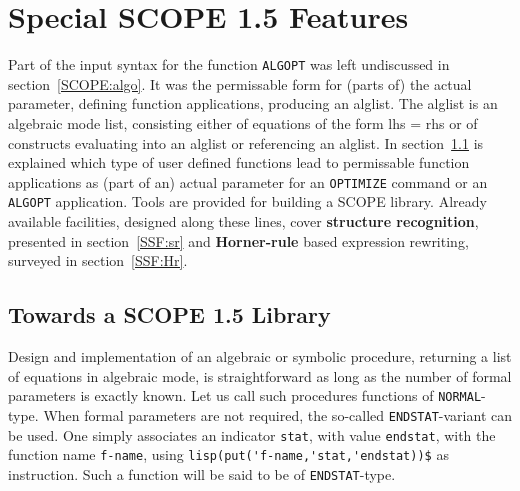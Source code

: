 \section{Special SCOPE 1.5 Features}\label{SCOPE:soph}

Part of the input syntax for the function {\tt ALGOPT} was left undiscussed
in section~\ref{SCOPE:algo}. It was the permissable form for (parts of)
the actual parameter, defining function applications, producing
an alglist. The alglist is an algebraic mode list, consisting
either of equations of the form lhs = rhs or of constructs
evaluating into an alglist or referencing an alglist.
In section~\ref{SSF:Sl} is explained which type of user defined
functions lead to permissable function applications as (part of an) actual
parameter for an {\tt OPTIMIZE} command or an {\tt ALGOPT} application.
Tools are provided for building a SCOPE library.
Already available facilities, designed along these lines, cover
{\bf structure recognition}, presented in section~\ref{SSF:sr} and
{\bf Horner-rule} based expression rewriting, surveyed in section~\ref{SSF:Hr}.

\subsection{Towards a SCOPE 1.5 Library}\label{SSF:Sl}

Design and implementation of an algebraic or symbolic procedure, returning
a list of equations in algebraic mode, is straightforward as long as the
number of formal parameters is exactly known. Let us call such procedures
functions of {\tt NORMAL}-type. When formal parameters are not required,
the so-called {\tt ENDSTAT}-variant can be used.
One simply associates an indicator {\tt stat}, with
value {\tt endstat}, with the function name {\tt f-name},
using \verb+lisp(put('f-name,'stat,'endstat))$+ as instruction.
Such a function will be said to be of {\tt ENDSTAT}-type.

